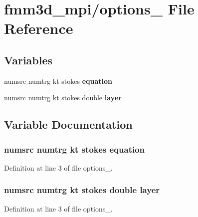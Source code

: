 \section{fmm3d\_\-mpi/options\_ File Reference}
\label{options__1}


\subsection*{Variables}
\begin{CompactItemize}
\item 
numsrc numtrg kt stokes {\bf equation}
\item 
numsrc numtrg kt stokes double {\bf layer}
\end{CompactItemize}


\subsection{Variable Documentation}
\subsubsection{\setlength{\rightskip}{0pt plus 5cm}numsrc numtrg kt stokes {\bf equation}}\label{options__1_1fc3e5c19c13c474bf1e23cf97130dc5_1fc3e5c19c13c474bf1e23cf97130dc5}




Definition at line 3 of file options\_.
\subsubsection{\setlength{\rightskip}{0pt plus 5cm}numsrc numtrg kt stokes double {\bf layer}}\label{options__1_f56b53e412e87751f665cb9f9061e50b_f56b53e412e87751f665cb9f9061e50b}




Definition at line 3 of file options\_.